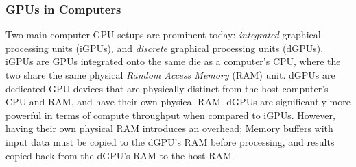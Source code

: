 \subsubsection{GPUs in Computers}

Two main computer GPU setups are prominent today: \textit{integrated} graphical processing units (iGPUs), and \textit{discrete} graphical processing units (dGPUs).
iGPUs are GPUs integrated onto the same die as a computer's CPU, where the two share the same physical \textit{Random Access Memory} (RAM) unit.
dGPUs are dedicated GPU devices that are physically distinct from the host computer's CPU and RAM, and have their own physical RAM.
dGPUs are significantly more powerful in terms of compute throughput when compared to iGPUs.
However, having their own physical RAM introduces an overhead;
Memory buffers with input data must be copied to the dGPU's RAM before processing, and results copied back from the dGPU's RAM to the host RAM.

